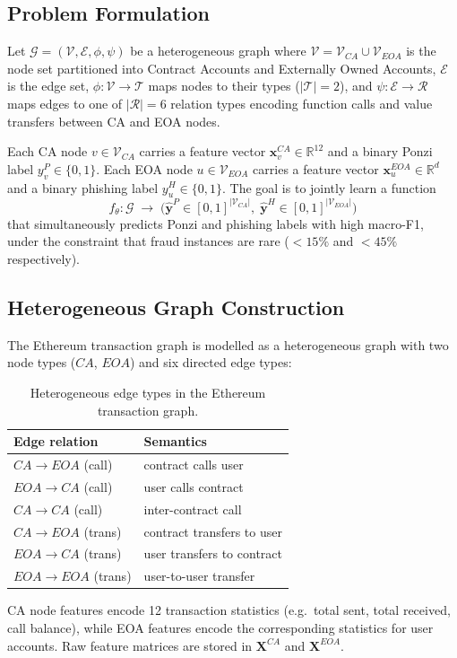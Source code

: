 \documentclass[conference]{IEEEtran}
\begin{document}
\subsection{Problem Formulation}

Let $\mathcal{G} = (\mathcal{V},\mathcal{E},\phi,\psi)$ be a
heterogeneous graph where $\mathcal{V} = \mathcal{V}_{CA} \cup
\mathcal{V}_{EOA}$ is the node set partitioned into Contract Accounts
and Externally Owned Accounts, $\mathcal{E}$ is the edge set,
$\phi: \mathcal{V}\!\to\!\mathcal{T}$ maps nodes to their types
($|\mathcal{T}|=2$), and $\psi: \mathcal{E}\!\to\!\mathcal{R}$ maps
edges to one of $|\mathcal{R}|=6$ relation types encoding function
calls and value transfers between CA and EOA nodes.

Each CA node $v\in\mathcal{V}_{CA}$ carries a feature vector
$\mathbf{x}_v^{CA}\in\mathbb{R}^{12}$ and a binary Ponzi label
$y_v^P\in\{0,1\}$.  Each EOA node $u\in\mathcal{V}_{EOA}$ carries
a feature vector $\mathbf{x}_u^{EOA}\in\mathbb{R}^d$ and a binary
phishing label $y_u^H\in\{0,1\}$.
The goal is to jointly learn a function
\begin{equation}
  f_\theta:\mathcal{G}
  \;\longrightarrow\;
  \bigl(\hat{\mathbf{y}}^P\in[0,1]^{|\mathcal{V}_{CA}|},\;
         \hat{\mathbf{y}}^H\in[0,1]^{|\mathcal{V}_{EOA}|}\bigr)
\end{equation}
that simultaneously predicts Ponzi and phishing labels with high
macro-F1, under the constraint that fraud instances are rare
($<15\%$ and $<45\%$ respectively).

\subsection{Heterogeneous Graph Construction}

The Ethereum transaction graph is modelled as a heterogeneous graph
with two node types ($CA$, $EOA$) and six directed edge types:
\begin{table}[h]
\centering
\caption{Heterogeneous edge types in the Ethereum transaction graph.}
\label{tab:edges}
\begin{tabular}{@{}ll@{}}
\toprule
Edge relation & Semantics \\
\midrule
$CA \!\to\! EOA$ (call)  & contract calls user \\
$EOA \!\to\! CA$ (call)  & user calls contract \\
$CA \!\to\! CA$ (call)   & inter-contract call \\
$CA \!\to\! EOA$ (trans) & contract transfers to user \\
$EOA \!\to\! CA$ (trans) & user transfers to contract \\
$EOA \!\to\! EOA$ (trans)& user-to-user transfer \\
\bottomrule
\end{tabular}
\end{table}
CA node features encode 12 transaction statistics (e.g.\ total sent,
total received, call balance), while EOA features encode the
corresponding statistics for user accounts.  Raw feature matrices are
stored in $\mathbf{X}^{CA}$ and $\mathbf{X}^{EOA}$.
\end{document}
